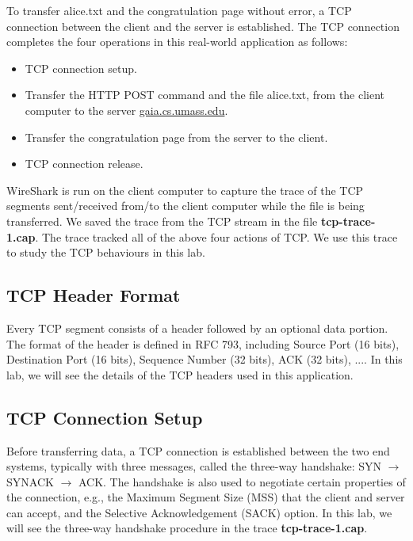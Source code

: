 To transfer alice.txt and the congratulation page without
error, a TCP connection between the client and the server is
established.  The TCP connection completes the four operations in this
real-world application as follows:

\begin{itemize}
    \item TCP connection setup.
    \item Transfer the HTTP POST command and the file alice.txt, from
      the client computer to the server \url{gaia.cs.umass.edu}.
    \item Transfer the congratulation page from the server to the client.
    \item TCP connection release.
\end{itemize}

WireShark is run on the client computer to capture the trace of the
TCP segments sent/received from/to the client computer while the
file is being transferred. We saved the trace from the TCP stream in
the file {\bf tcp-trace-1.cap}. The trace tracked all of the above
four actions of TCP. We use this trace to study the 
TCP behaviours in this lab.

\subsection{TCP Header Format}

\hspace*{0.5cm} Every TCP segment consists of a header followed by an
optional data portion. The format of the header is defined in RFC 793,
including Source Port (16 bits), Destination Port (16 bits), Sequence
Number (32 bits), ACK (32 bits), .... In this lab, we will see the
details of the TCP headers used in this 
application.

\subsection{TCP Connection Setup}

\hspace*{0.5cm} Before transferring data, a TCP connection is
established between the two end systems, typically with  three messages,
called the three-way handshake: SYN $\rightarrow$ SYNACK $\rightarrow$
ACK.  The handshake is also used to negotiate certain properties of
the connection, e.g., the Maximum Segment Size (MSS) that the client
and server can accept, and the Selective Acknowledgement (SACK)
option.  In this lab, we will see the three-way handshake procedure in
the trace {\bf tcp-trace-1.cap}.%

